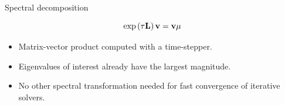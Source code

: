 \documentclass[aspectratio=169, usenames, dvipsnames]{beamer}
\begin{document}
\begin{frame}[t, c]{Spectral decomposition}{}
  \vfill
  \begin{minipage}{.48\textwidth}
    {
      \Large
      \[
        \exp \left( \tau \vb{L} \right) \vb{v} = \vb{v} \mu
      \]
    }
  \end{minipage}%
  \hfill
  \begin{minipage}{.48\textwidth}
    \begin{itemize}
    \item Matrix-vector product computed with a time-stepper.

      \bigskip

    \item Eigenvalues of interest already have the largest magnitude.

      \bigskip

    \item No other spectral transformation needed for fast convergence of iterative solvers.
    \end{itemize}
  \end{minipage}
  \vfill
\end{frame}
\end{document}
